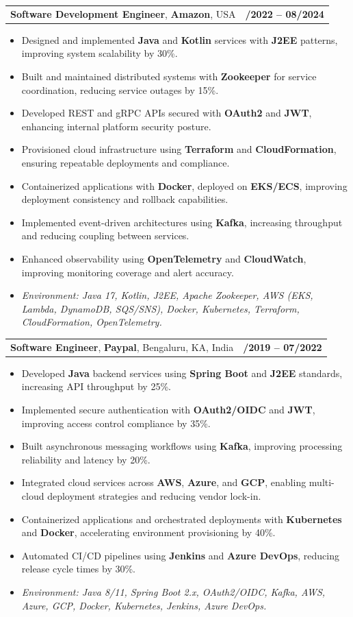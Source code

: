 \documentclass[letterpaper,11pt]{article}
\makeatletter
\newcommand{\resumeItem}[1]{
  \item\footnotesize{
    {#1 \vspace{-2pt}}
  }
}
\newcommand{\resumeSubheading}[4]{
  \vspace{-2pt}\item
    \begin{tabular*}{1.0\textwidth}[t]{l@{\extracolsep{\fill}}r}
      \textbf{\fontsize{10pt}{14pt}\selectfont #3}, \textbf{\fontsize{10pt}{14pt}\selectfont #1}, \fontsize{10pt}{14pt}\selectfont #4 & \textbf{\fontsize{10pt}{14pt}\selectfont #2} \\
    \end{tabular*}\vspace{-7pt}
}
\newcommand{\resumeItemListStart}{\begin{itemize}[leftmargin=*]}
\newcommand{\resumeItemListEnd}{\end{itemize}\vspace{-5pt}}
\makeatother
\begin{document}
\resumeSubheading
{Amazon}{10/2022 -- 08/2024}
{Software Development Engineer}{USA}
\resumeItemListStart
  \resumeItem{Designed and implemented \textbf{Java} and \textbf{Kotlin} services with \textbf{J2EE} patterns, improving system scalability by 30\%.}
  \resumeItem{Built and maintained distributed systems with \textbf{Zookeeper} for service coordination, reducing service outages by 15\%.}
  \resumeItem{Developed REST and gRPC APIs secured with \textbf{OAuth2} and \textbf{JWT}, enhancing internal platform security posture.}
  \resumeItem{Provisioned cloud infrastructure using \textbf{Terraform} and \textbf{CloudFormation}, ensuring repeatable deployments and compliance.}
  \resumeItem{Containerized applications with \textbf{Docker}, deployed on \textbf{EKS/ECS}, improving deployment consistency and rollback capabilities.}
  \resumeItem{Implemented event-driven architectures using \textbf{Kafka}, increasing throughput and reducing coupling between services.}
  \resumeItem{Enhanced observability using \textbf{OpenTelemetry} and \textbf{CloudWatch}, improving monitoring coverage and alert accuracy.}
  \resumeItem{\textit{Environment: Java 17, Kotlin, J2EE, Apache Zookeeper, AWS (EKS, Lambda, DynamoDB, SQS/SNS), Docker, Kubernetes, Terraform, CloudFormation, OpenTelemetry.}}
\resumeItemListEnd

\resumeSubheading
{Paypal}{08/2019 -- 07/2022}
{Software Engineer}{Bengaluru, KA, India}
\resumeItemListStart
  \resumeItem{Developed \textbf{Java} backend services using \textbf{Spring Boot} and \textbf{J2EE} standards, increasing API throughput by 25\%.}
  \resumeItem{Implemented secure authentication with \textbf{OAuth2/OIDC} and \textbf{JWT}, improving access control compliance by 35\%.}
  \resumeItem{Built asynchronous messaging workflows using \textbf{Kafka}, improving processing reliability and latency by 20\%.}
  \resumeItem{Integrated cloud services across \textbf{AWS}, \textbf{Azure}, and \textbf{GCP}, enabling multi-cloud deployment strategies and reducing vendor lock-in.}
  \resumeItem{Containerized applications and orchestrated deployments with \textbf{Kubernetes} and \textbf{Docker}, accelerating environment provisioning by 40\%.}
  \resumeItem{Automated CI/CD pipelines using \textbf{Jenkins} and \textbf{Azure DevOps}, reducing release cycle times by 30\%.}
  \resumeItem{\textit{Environment: Java 8/11, Spring Boot 2.x, OAuth2/OIDC, Kafka, AWS, Azure, GCP, Docker, Kubernetes, Jenkins, Azure DevOps.}}
\resumeItemListEnd
\end{document}
